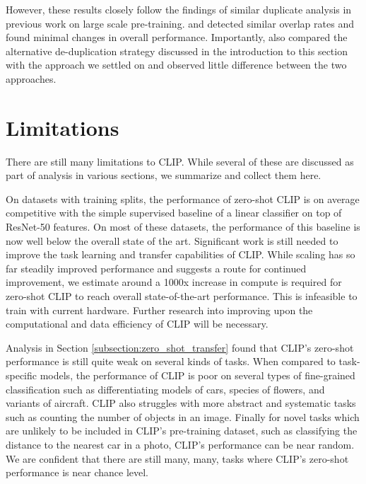 However, these results closely follow the findings of similar duplicate analysis in previous work on large scale pre-training. \citet{mahajan2018exploring} and \citet{kolesnikov2019large} detected similar overlap rates and found minimal changes in overall performance. Importantly, \citet{kolesnikov2019large} also compared the alternative de-duplication strategy discussed in the introduction to this section with the approach we settled on and observed little difference between the two approaches.

\section{Limitations}

There are still many limitations to CLIP. While several of these are discussed as part of analysis in various sections, we summarize and collect them here.

On datasets with training splits, the performance of zero-shot CLIP is on average competitive with the simple supervised baseline of a linear classifier on top of ResNet-50 features. On most of these datasets, the performance of this baseline is now well below the overall state of the art. Significant work is still needed to improve the task learning and transfer capabilities of CLIP. While scaling has so far steadily improved performance and suggests a route for continued improvement, we estimate around a 1000x increase in compute is required for zero-shot CLIP to reach overall state-of-the-art performance. This is infeasible to train with current hardware. Further research into improving upon the computational and data efficiency of CLIP will be necessary.

Analysis in Section \ref{subsection:zero_shot_transfer} found that CLIP's zero-shot performance is still quite weak on several kinds of tasks. When compared to task-specific models, the performance of CLIP is poor on several types of fine-grained classification such as differentiating models of cars, species of flowers, and variants of aircraft. CLIP also struggles with more abstract and systematic tasks such as counting the number of objects in an image. Finally for novel tasks which are unlikely to be included in CLIP's pre-training dataset, such as classifying the distance to the nearest car in a photo, CLIP's performance can be near random. We are confident that there are still many, many, tasks where CLIP's zero-shot performance is near chance level.

